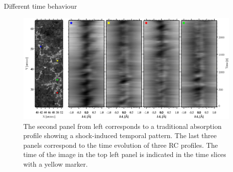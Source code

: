 \documentclass{beamer}
\begin{document}
\begin{frame}{Different time behaviour}

\vspace{-0.8cm}

\begin{figure}[H]
 \centering
 \includegraphics[scale=0.4]{im1.png}
\caption{ The second panel from left corresponds to a traditional absorption profile showing a
shock-induced temporal pattern. The last three panels correspond to the time evolution of three RC profiles. The time of the image in the top left panel is indicated
in the time slices with a yellow marker.}
\end{figure}

\end{frame}
\end{document}
